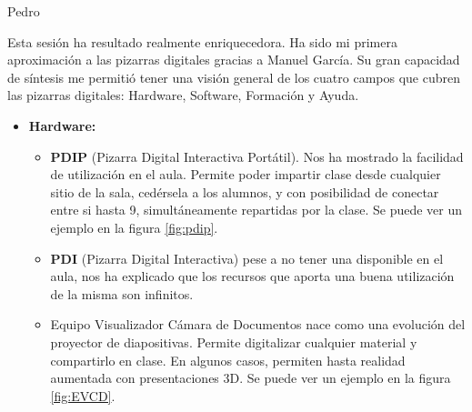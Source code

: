 \begin{opin}{\pedrocolor}{Pedro}


Esta sesión ha resultado realmente enriquecedora. Ha sido mi primera aproximación a las pizarras digitales gracias a Manuel García. Su gran capacidad de síntesis me permitió tener una visión general de los cuatro campos que cubren las pizarras digitales: Hardware, Software, Formación y Ayuda.

\begin{itemize}

\item \textbf{Hardware:}
\begin{itemize}

\item \textbf{PDIP} (Pizarra Digital Interactiva Portátil). Nos ha mostrado la facilidad de utilización en el aula. Permite poder impartir clase desde cualquier sitio de la sala, cedérsela a los alumnos, y con posibilidad de conectar entre si hasta 9,  simultáneamente repartidas por la clase. 
%
Se puede ver un ejemplo en la figura \ref{fig:pdip}.

 
\item \textbf{PDI} (Pizarra Digital Interactiva) pese a no tener una disponible en el aula, nos ha explicado que los recursos que aporta una buena utilización de la misma son infinitos. 

\item Equipo Visualizador Cámara de Documentos nace como una evolución del proyector de diapositivas. Permite digitalizar cualquier material y compartirlo en clase. En algunos casos, permiten hasta realidad aumentada con presentaciones 3D. 
Se puede ver un ejemplo en la figura \ref{fig:EVCD}.


\end{itemize}
\end{itemize}
\end{opin}
